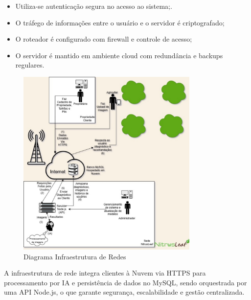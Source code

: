 \medskip
{}
\begin{itemize}
    \item Utiliza-se autenticação segura no acesso ao sistema;.
    \item O tráfego de informações entre o usuário e o servidor é criptografado;
    \item O roteador é configurado com firewall e controle de acesso;
    \item O servidor é mantido em ambiente cloud com redundância e backups regulares.
\end{itemize}

\medskip

\begin{figure}[H]
\centering
\caption{Diagrama Infraestrutura de Redes}
\label{fig:diagrama-infraestrutura}
\includegraphics[width=0.8\textwidth]{Images/DiagramaInfraestruturaDeRedes.jpg}
\end{figure}
\medskip

A infraestrutura de rede integra clientes à Nuvem via HTTPS para processamento por 
IA e persistência de dados no MySQL, sendo orquestrada por uma API Node.js, o que garante segurança, 
escalabilidade e gestão centralizada.
\medskip